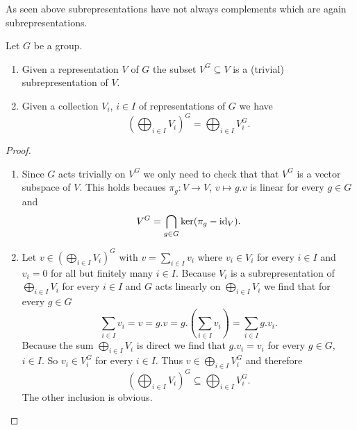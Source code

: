 \begin{warn}
  As seen above subrepresentations have not always complements which are again subrepresentations.
\end{warn}


\begin{lem}\label{lem: direct sum and invariants commute}
  Let $G$ be a group.
  \begin{enumerate}[label=\emph{\alph*)},leftmargin=*]
    \item
      Given a representation $V$ of $G$ the subset $V^G \subseteq V$ is a (trivial) subrepresentation of $V$.
    \item
      Given a collection $V_i$, $i \in I$ of representations of $G$ we have
      \[
          \left(
            \bigoplus_{i \in I} V_i
          \right)^G
        = \bigoplus_{i \in I} V_i^G.
      \]
  \end{enumerate}
\end{lem}
\begin{proof}
  \begin{enumerate}[label=\emph{\alph*)},leftmargin=*]
    \item
      Since $G$ acts trivially on $V^G$ we only need to check that that $V^G$ is a vector subspace of $V$.
      This holds becaues $\pi_g \colon V \to V$, $v \mapsto g.v$ is linear for every $g \in G$ and
      \[
          V^G
        = \bigcap_{g \in G} \ker(\pi_g - \operatorname{id}_V).
      \]
    \item
      Let $v \in \left( \bigoplus_{i \in I} V_i \right)^G$ with $v = \sum_{i \in I} v_i$ where $v_i \in V_i$ for every $i \in I$ and $v_i = 0$ for all but finitely many $i \in I$.
      Because $V_i$ is a subrepresentation of $\bigoplus_{i \in I} V_i$ for every $i \in I$ and $G$ acts linearly on $\bigoplus_{i \in I} V_i$ we find that for every $g \in G$
      \[
          \sum_{i \in I} v_i
        = v
        = g.v
        = g.\left( \sum_{i \in I} v_i \right)
        = \sum_{i \in I} g.v_i.
      \]
      Because the sum $\bigoplus_{i \in I} V_i$ is direct we find that $g.v_i = v_i$ for every $g \in G$, $i \in I$.
      So $v_i \in V_i^G$ for every $i \in I$.
      Thus $v \in \bigoplus_{i \in I} V_i^G$ and therefore
      \[
                  \left(
                    \bigoplus_{i \in I} V_i
                  \right)^G
        \subseteq \bigoplus_{i \in I} V_i^G.
      \]
      The other inclusion is obvious.
  \end{enumerate}
\end{proof}





